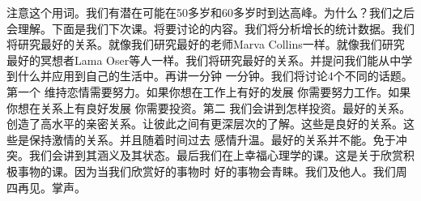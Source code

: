 注意这个用词。我们有潜在可能在50多岁和60多岁时到达高峰。为什么？我们之后会理解。下面是我们下次课。将要讨论的内容。我们将分析增长的统计数据。我们将研究最好的关系。就像我们研究最好的老师Marva Collins一样。就像我们研究最好的冥想者Lama Oser等人一样。我们将研究最好的关系。并提问我们能从中学到什么并应用到自己的生活中。再讲一分钟 一分钟。我们将讨论4个不同的话题。第一个 维持恋情需要努力。如果你想在工作上有好的发展 你需要努力工作。如果你想在关系上有良好发展 你需要投资。第二 我们会讲到怎样投资。最好的关系。创造了高水平的亲密关系。让彼此之间有更深层次的了解。这些是良好的关系。这些是保持激情的关系。并且随着时间过去 感情升温。最好的关系并不能。免于冲突。我们会讲到其涵义及其状态。最后我们在上幸福心理学的课。这是关于欣赏积极事物的课。因为当我们欣赏好的事物时 好的事物会青睐。我们及他人。我们周四再见。掌声。 
%
%
%
%
